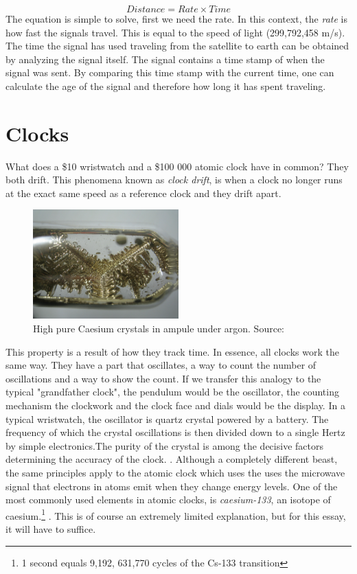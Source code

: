 \documentclass[12pt,english,a4paper]{article}
\begin{document}
\begin{equation} Distance = Rate \times Time \end{equation} 
The equation is simple to solve, first we need the rate. In this context, the \textit{rate} is how fast the signals travel. This is equal to the speed of light (299,792,458 m/s). The time the signal has used traveling from the satellite to earth can be obtained by analyzing the signal itself. The signal contains a time stamp of when the signal was sent. By comparing this time stamp with the current time, one can calculate the age of the signal and therefore how long it has spent traveling. \cite{GPSGOVTE}  

\section{Clocks}
What does a \$10 wristwatch and a \$100 000 atomic clock have in common? They both drift. This phenomena known as \textit{clock drift}, is when a clock no longer runs at the exact same speed as a reference clock and they drift apart.
\begin{figure}
  \centering
  \includegraphics[width=0.50\textwidth]{cscrystals.jpg}
  \caption[Caesium campule]
   {High pure Caesium crystals in ampule under argon. Source: \cite{DENCES}}
\end{figure} 
This property is a result of how they track time. In essence, all clocks work the same way. They have a part that oscillates, a way to count the number of oscillations and a way to show the count. If we transfer this analogy to the typical "grandfather clock", the pendulum would be the oscillator, the counting mechanism the clockwork and the clock face and dials would be the display. In a typical wristwatch, the oscillator is quartz crystal powered by a battery. The frequency of which the crystal oscillations is then divided down to a single Hertz by simple electronics.The purity of the crystal is among the decisive factors determining the accuracy of the clock. \cite{CSMG}. 
Although a completely different beast, the same principles apply to the atomic clock which uses the uses the microwave signal that electrons in atoms emit when they change energy levels. One of the most commonly used elements in atomic clocks, is \textit{caesium-133}, an isotope of caesium.\footnote{1 second equals 9,192, 631,770 cycles of the Cs-133 transition} \cite{HP}. This is of course an extremely limited explanation, but for this essay, it will have to suffice.
\end{document}
